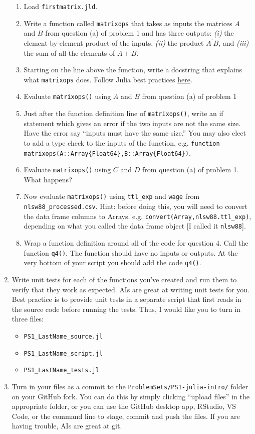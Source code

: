 \documentclass[12pt,english]{article}
\begin{document}
\begin{enumerate}
\begin{enumerate}
\item Load \texttt{firstmatrix.jld}.
\item Write a function called \texttt{matrixops} that takes as inputs the matrices $A$ and $B$ from question (a) of problem 1 and has three outputs: \emph{(i)} the element-by-element product of the inputs, \emph{(ii)} the product $A^{\prime}B$, and \emph{(iii)} the sum of all the elements of $A+B$.
\item Starting on the line above the function, write a docstring that explains what \texttt{matrixops} does. Follow Julia best practices \href{https://docs.julialang.org/en/v1/manual/documentation/}{here}.
\item Evaluate \texttt{matrixops()} using $A$ and $B$ from question (a) of problem 1
\item Just after the function definition line of \texttt{matrixops()}, write an if statement which gives an error if the two inputs are not the same size. Have the error say ``inputs must have the same size.'' You may also elect to add a type check to the inputs of the function, e.g. \texttt{function matrixops(A::Array\{Float64\},B::Array\{Float64\})}.
\item Evaluate \texttt{matrixops()} using $C$ and $D$ from question (a) of problem 1. What happens?
\item Now evaluate \texttt{matrixops()} using \texttt{ttl\_exp} and \texttt{wage} from \texttt{nlsw88\_processed.csv}. Hint: before doing this, you will need to convert the data frame columns to Arrays. e.g. \texttt{convert(Array,nlsw88.ttl\_exp)}, depending on what you called the data frame object [I called it \texttt{nlsw88}].
\item Wrap a function definition around all of the code for question 4. Call the function \texttt{q4()}. The function should have no inputs or outputs. At the very bottom of your script you should add the code \texttt{q4()}.
\end{enumerate}

\item Write unit tests for each of the functions you've created and run them to verify that they work as expected. AIs are great at writing unit tests for you. Best practice is to provide unit tests in a separate script that first reads in the source code before running the tests. Thus, I would like you to turn in three files:
    \begin{itemize}
        \item \texttt{PS1\_LastName\_source.jl}
        \item \texttt{PS1\_LastName\_script.jl}
        \item \texttt{PS1\_LastName\_tests.jl}
    \end{itemize}

\item Turn in your files as a commit to the \texttt{ProblemSets/PS1-julia-intro/} folder on your GitHub fork. You can do this by simply clicking ``upload files'' in the appropriate folder, or you can use the GitHub desktop app, RStudio, VS Code, or the command line to stage, commit and push the files. If you are having trouble, AIs are great at git.
\end{enumerate}
\end{document}
